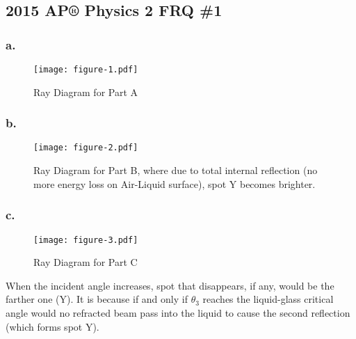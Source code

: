 \documentclass{elegantpaper}
\begin{document}
\subsection{2015 AP® Physics 2 FRQ \#1}
\subsubsection*{a.}
\begin{figure}[!ht]
	\centering
	\texttt{[image: figure-1.pdf]}
	\caption{Ray Diagram for Part A}
	\centering
  \label{label:f1}
\end{figure}
\subsubsection*{b.}
\begin{figure}[!ht]
	\centering
	\texttt{[image: figure-2.pdf]}
	\caption{Ray Diagram for Part B, where due to total internal reflection (no more energy loss on Air-Liquid surface), spot Y becomes brighter.}
	\centering
  \label{label:f1}
\end{figure}
\clearpage
\subsubsection*{c.}
\begin{figure}[!ht]
	\centering
	\texttt{[image: figure-3.pdf]}
	\caption{Ray Diagram for Part C}
	\centering
  \label{label:f1}
\end{figure}
When the incident angle increases, spot that disappears, if any, would be the farther one (Y). It is because if and only if $\theta_3$ reaches the liquid-glass critical angle would no refracted beam pass into the liquid to cause the second reflection (which forms spot Y).
\end{document}

